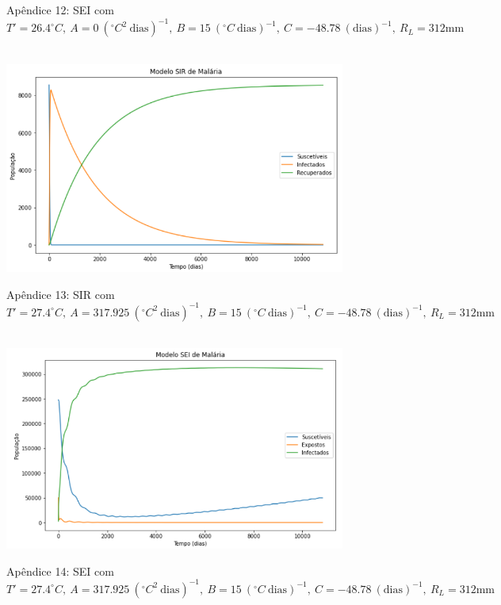 \documentclass[
	12pt,				%
	oneside,			%
	a4paper,			%
	english,			%
	brazil				%
	]{abntex2}
\begin{document}
\begin{apendicesenv}
\begin{figure}[!ht]
	\caption*{Apêndice 12: SEI com $T'=26.4^\circ C, \ A=0 \ (^\circ C^2 \ \text{dias})^{-1}, \ B=15 \ (^\circ C \ \text{dias})^{-1}, \ C=-48.78 \ (\text{dias})^{-1}, \ R_L=312 \text{mm}$}
\end{figure}
\newpage
\begin{figure}[!ht]
	\centering
	\hbox{\hspace{4.0em} \includegraphics[scale=0.6] {SIR_Correcao_max_T_linha.png}}
	\caption*{Apêndice 13: SIR com $T'=27.4^\circ C, \ A=317.925 \ (^\circ C^2 \ \text{dias})^{-1}, \ B=15 \ (^\circ C \ \text{dias})^{-1}, \ C=-48.78 \ (\text{dias})^{-1}, \ R_L=312 \text{mm}$}
\end{figure} 
\begin{figure}[!ht]
	\centering
	\hbox{\hspace{3.0em} \includegraphics[scale=0.6] {SEI_Correcao_max_T_linha.png}}
	\caption*{Apêndice 14: SEI com $T'=27.4^\circ C, \ A=317.925 \ (^\circ C^2 \ \text{dias})^{-1}, \ B=15 \ (^\circ C \ \text{dias})^{-1}, \ C=-48.78 \ (\text{dias})^{-1}, \ R_L=312 \text{mm}$}

\end{figure}
\end{apendicesenv}
\end{document}
